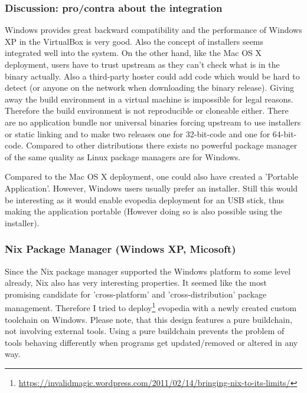 \documentclass[a4paper,10pt]{article}
\begin{document}
\subsubsection*{Discussion: pro/contra about the integration}
Windows provides great backward compatibility and the performance of Windows XP in the VirtualBox is very good. Also the concept of installers seems integrated well into the system. On the other hand, like the Mac OS X deployment, users have to trust upstream as they can't check what is in the binary actually. Also a third-party hoster could add code which would be hard to detect (or anyone on the network when downloading the binary release). Giving away the build environment in a virtual machine is impossible for legal reasons. Therefore the build environment is not reproducible or cloneable either. There are no application bundle nor universal binaries forcing upstream to use installers or static linking and to make two releases one for 32-bit-code and one for 64-bit-code. Compared to other distributions there exists no powerful package manager of the same quality as Linux package managers are for Windows. 

Compared to the Mac OS X deployment, one could also have created a 'Portable Application'. However, Windows users usually prefer an installer. Still this would be interesting as it would enable evopedia deployment for an USB stick, thus making the application portable (However doing so is also possible using the installer).










\newpage
\subsubsection{Nix Package Manager (Windows XP, Micosoft)}
\label{nixonwindows}
Since the Nix package manager supported the Windows platform to some level already, Nix also has very interesting properties. It seemed like the most promising candidate for 'cross-platform' and 'cross-distribution' package management. Therefore I tried to deploy\footnote{\url{https://invalidmagic.wordpress.com/2011/02/14/bringing-nix-to-its-limits/}} evopedia with a newly created custom toolchain on Windows. Please note, that this design features a pure buildchain, not involving external tools. Using a pure buildchain prevents the problem of tools behaving differently when programs get updated/removed or altered in any way.
\end{document}
